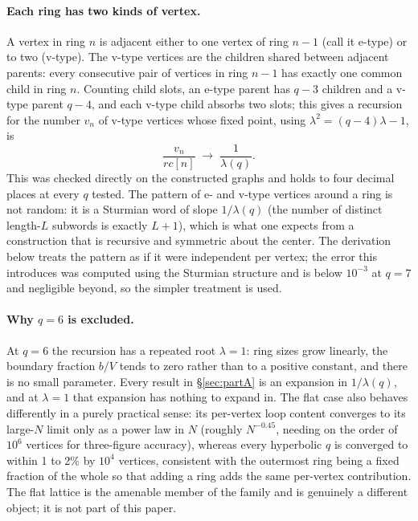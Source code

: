 \documentclass[11pt]{article}
\begin{document}
\paragraph{Each ring has two kinds of vertex.} A vertex in ring $n$ is adjacent either to one vertex of ring $n-1$ (call it e-type) or to two (v-type). The v-type vertices are the children shared between adjacent parents: every consecutive pair of vertices in ring $n-1$ has exactly one common child in ring $n$. Counting child slots, an e-type parent has $q-3$ children and a v-type parent $q-4$, and each v-type child absorbs two slots; this gives a recursion for the number $v_n$ of v-type vertices whose fixed point, using $\lambda^2=(q-4)\lambda-1$, is
\[
\frac{v_n}{rc[n]} \;\to\; \frac{1}{\lambda(q)}.
\]
This was checked directly on the constructed graphs and holds to four decimal places at every $q$ tested. The pattern of e- and v-type vertices around a ring is not random: it is a Sturmian word of slope $1/\lambda(q)$ (the number of distinct length-$L$ subwords is exactly $L+1$), which is what one expects from a construction that is recursive and symmetric about the center. The derivation below treats the pattern as if it were independent per vertex; the error this introduces was computed using the Sturmian structure and is below $10^{-3}$ at $q=7$ and negligible beyond, so the simpler treatment is used.

\paragraph{Why $q=6$ is excluded.} At $q=6$ the recursion has a repeated root $\lambda=1$: ring sizes grow linearly, the boundary fraction $b/V$ tends to zero rather than to a positive constant, and there is no small parameter. Every result in \S\ref{sec:partA} is an expansion in $1/\lambda(q)$, and at $\lambda=1$ that expansion has nothing to expand in. The flat case also behaves differently in a purely practical sense: its per-vertex loop content converges to its large-$N$ limit only as a power law in $N$ (roughly $N^{-0.45}$, needing on the order of $10^6$ vertices for three-figure accuracy), whereas every hyperbolic $q$ is converged to within 1 to 2\% by $10^4$ vertices, consistent with the outermost ring being a fixed fraction of the whole so that adding a ring adds the same per-vertex contribution. The flat lattice is the amenable member of the family and is genuinely a different object; it is not part of this paper.
\end{document}
